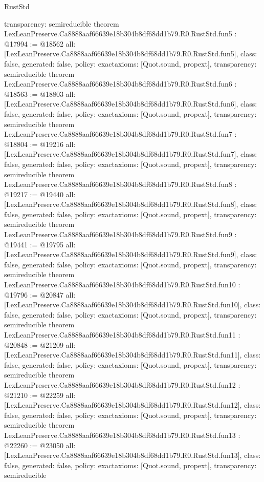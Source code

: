 \begin{lexlean}{RustStd}
\begin{coremodule}
{  transparency: semireducible
}
theorem LexLeanPreserve.Ca8888aaf66639e18b304b8df68dd1b79.R0.RustStd.fun5 : @17994 := @18562 {
  all: [LexLeanPreserve.Ca8888aaf66639e18b304b8df68dd1b79.R0.RustStd.fun5],
  class: false,
  generated: false,
  policy: exact{axioms: [Quot.sound, propext]},
  transparency: semireducible
}
theorem LexLeanPreserve.Ca8888aaf66639e18b304b8df68dd1b79.R0.RustStd.fun6 : @18563 := @18803 {
  all: [LexLeanPreserve.Ca8888aaf66639e18b304b8df68dd1b79.R0.RustStd.fun6],
  class: false,
  generated: false,
  policy: exact{axioms: [Quot.sound, propext]},
  transparency: semireducible
}
theorem LexLeanPreserve.Ca8888aaf66639e18b304b8df68dd1b79.R0.RustStd.fun7 : @18804 := @19216 {
  all: [LexLeanPreserve.Ca8888aaf66639e18b304b8df68dd1b79.R0.RustStd.fun7],
  class: false,
  generated: false,
  policy: exact{axioms: [Quot.sound, propext]},
  transparency: semireducible
}
theorem LexLeanPreserve.Ca8888aaf66639e18b304b8df68dd1b79.R0.RustStd.fun8 : @19217 := @19440 {
  all: [LexLeanPreserve.Ca8888aaf66639e18b304b8df68dd1b79.R0.RustStd.fun8],
  class: false,
  generated: false,
  policy: exact{axioms: [Quot.sound, propext]},
  transparency: semireducible
}
theorem LexLeanPreserve.Ca8888aaf66639e18b304b8df68dd1b79.R0.RustStd.fun9 : @19441 := @19795 {
  all: [LexLeanPreserve.Ca8888aaf66639e18b304b8df68dd1b79.R0.RustStd.fun9],
  class: false,
  generated: false,
  policy: exact{axioms: [Quot.sound, propext]},
  transparency: semireducible
}
theorem LexLeanPreserve.Ca8888aaf66639e18b304b8df68dd1b79.R0.RustStd.fun10 : @19796 := @20847 {
  all: [LexLeanPreserve.Ca8888aaf66639e18b304b8df68dd1b79.R0.RustStd.fun10],
  class: false,
  generated: false,
  policy: exact{axioms: [Quot.sound, propext]},
  transparency: semireducible
}
theorem LexLeanPreserve.Ca8888aaf66639e18b304b8df68dd1b79.R0.RustStd.fun11 : @20848 := @21209 {
  all: [LexLeanPreserve.Ca8888aaf66639e18b304b8df68dd1b79.R0.RustStd.fun11],
  class: false,
  generated: false,
  policy: exact{axioms: [Quot.sound, propext]},
  transparency: semireducible
}
theorem LexLeanPreserve.Ca8888aaf66639e18b304b8df68dd1b79.R0.RustStd.fun12 : @21210 := @22259 {
  all: [LexLeanPreserve.Ca8888aaf66639e18b304b8df68dd1b79.R0.RustStd.fun12],
  class: false,
  generated: false,
  policy: exact{axioms: [Quot.sound, propext]},
  transparency: semireducible
}
theorem LexLeanPreserve.Ca8888aaf66639e18b304b8df68dd1b79.R0.RustStd.fun13 : @22260 := @23050 {
  all: [LexLeanPreserve.Ca8888aaf66639e18b304b8df68dd1b79.R0.RustStd.fun13],
  class: false,
  generated: false,
  policy: exact{axioms: [Quot.sound, propext]},
  transparency: semireducible
}
\end{coremodule}
\end{lexlean}
